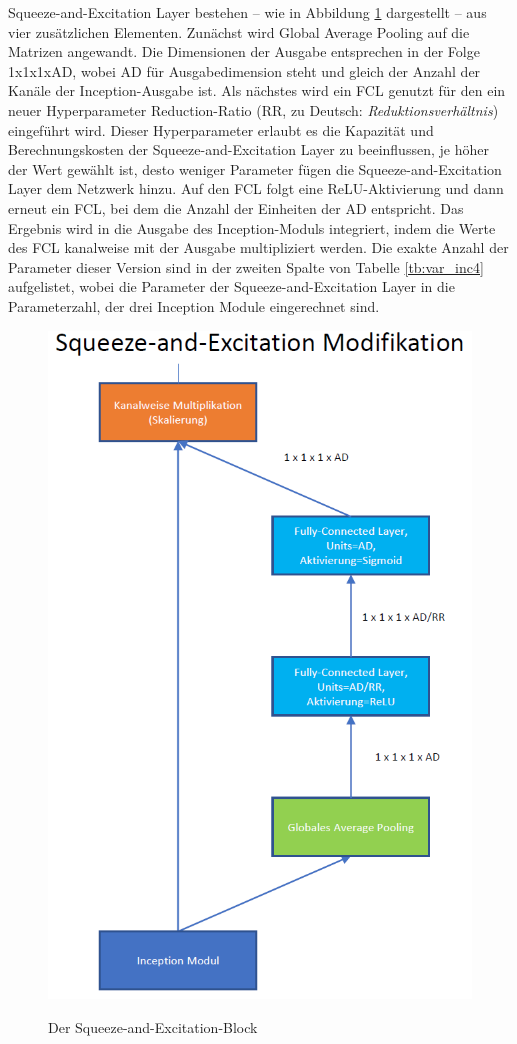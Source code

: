 Squeeze-and-Excitation Layer bestehen -- wie in Abbildung \ref{fig:sae} dargestellt -- aus vier zusätzlichen Elementen. Zunächst wird Global Average Pooling auf die Matrizen angewandt. Die Dimensionen der Ausgabe entsprechen in der Folge 1x1x1xAD, wobei AD für Ausgabedimension steht und gleich der Anzahl der Kanäle der Inception-Ausgabe ist. Als nächstes wird ein FCL genutzt für den ein neuer Hyperparameter Reduction-Ratio (RR, zu Deutsch: \textit{Reduktionsverhältnis}) eingeführt wird. Dieser Hyperparameter erlaubt es die Kapazität und Berechnungskosten der Squeeze-and-Excitation Layer zu beeinflussen, je höher der Wert gewählt ist, desto weniger Parameter fügen die Squeeze-and-Excitation Layer dem Netzwerk hinzu. Auf den FCL folgt eine ReLU-Aktivierung und dann erneut ein FCL, bei dem die Anzahl der Einheiten der AD entspricht. Das Ergebnis wird in die Ausgabe des Inception-Moduls integriert, indem die Werte des FCL kanalweise mit der Ausgabe multipliziert werden.  Die exakte Anzahl der Parameter dieser Version sind in der zweiten Spalte von Tabelle \ref{tb:var_inc4} aufgelistet, wobei die Parameter der Squeeze-and-Excitation Layer in die Parameterzahl, der drei Inception Module eingerechnet sind.

\begin{figure}[H]
\centering
\caption[Caption for LOF]{Der Squeeze-and-Excitation-Block}
\includegraphics[scale=0.75]{pictures/Inception/SqueezeAndExcitation}
\label{fig:sae}
\end{figure}
